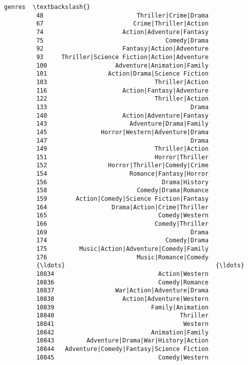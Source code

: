 \documentclass[11pt]{article}
\begin{document}
\begin{Verbatim}[commandchars=\\\{\}]
                                                   genres  \textbackslash{}
         48                          Thriller|Crime|Drama   
         67                         Crime|Thriller|Action   
         74                      Action|Adventure|Fantasy   
         75                                  Comedy|Drama   
         92                      Fantasy|Action|Adventure   
         93     Thriller|Science Fiction|Action|Adventure   
         100                   Adventure|Animation|Family   
         101                 Action|Drama|Science Fiction   
         103                              Thriller|Action   
         116                     Action|Fantasy|Adventure   
         122                              Thriller|Action   
         133                                        Drama   
         140                     Action|Adventure|Fantasy   
         143                       Adventure|Drama|Family   
         145               Horror|Western|Adventure|Drama   
         147                                        Drama   
         149                              Thriller|Action   
         151                              Horror|Thriller   
         152                 Horror|Thriller|Comedy|Crime   
         154                       Romance|Fantasy|Horror   
         156                                Drama|History   
         158                         Comedy|Drama|Romance   
         159        Action|Comedy|Science Fiction|Fantasy   
         164                  Drama|Action|Crime|Thriller   
         165                               Comedy|Western   
         166                              Comedy|Thriller   
         169                                        Drama   
         174                                 Comedy|Drama   
         175         Music|Action|Adventure|Comedy|Family   
         176                         Music|Romance|Comedy   
         {\ldots}                                          {\ldots}   
         10834                             Action|Western   
         10836                             Comedy|Romance   
         10837                 War|Action|Adventure|Drama   
         10838                   Action|Adventure|Western   
         10839                           Family|Animation   
         10840                                   Thriller   
         10841                                    Western   
         10842                           Animation|Family   
         10843         Adventure|Drama|War|History|Action   
         10844   Adventure|Comedy|Fantasy|Science Fiction   
         10845                             Comedy|Western   

\end{Verbatim}
\end{document}
